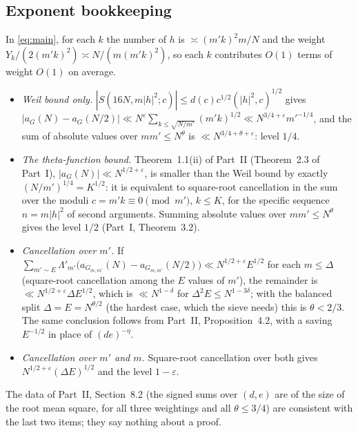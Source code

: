 \documentclass[11pt,a4paper]{article}
\theoremstyle{remark}
\theoremstyle{definition}
\newcommand{\e}{\varepsilon}
\begin{document}
\subsection{Exponent bookkeeping}
In \eqref{eq:main}, for each $k$ the number of $h$ is $\asymp(m'k)^2m/N$ and the weight $Y_k/(2(m'k)^2)\asymp N/(m(m'k)^2)$, so each $k$ contributes $O(1)$ terms of weight $O(1)$ on average.
\begin{itemize}[leftmargin=1.6em]
\item \emph{Weil bound only.} $|S(16N,m|h|^2;c)|\le d(c)c^{1/2}(|h|^2,c)^{1/2}$ gives $|a_G(N)-a_G(N/2)|\ll N^\e\sum_{k\le\sqrt{N/m'}}(m'k)^{1/2}\ll N^{3/4+\e}m'^{-1/4}$, and the sum of absolute values over $mm'\le N^\theta$ is $\ll N^{3/4+\theta+\e}$: level $1/4$.
\item \emph{The theta-function bound.} Theorem~1.1(ii) of Part~II (Theorem~2.3 of Part~I), $|a_G(N)|\ll N^{1/2+\e}$, is smaller than the Weil bound by exactly $(N/m')^{1/4}=K^{1/2}$: it is equivalent to square-root cancellation in the sum over the moduli $c=m'k\equiv0\pmod{m'}$, $k\le K$, for the specific sequence $n=m|h|^2$ of second arguments. Summing absolute values over $mm'\le N^\theta$ gives the level $1/2$ (Part~I, Theorem~3.2).
\item \emph{Cancellation over $m'$.} If $\sum_{m'\sim E}\Lambda'_{m'}\bigl(a_{G_{m,m'}}(N)-a_{G_{m,m'}}(N/2)\bigr)\ll N^{1/2+\e}E^{1/2}$ for each $m\le\Delta$ (square-root cancellation among the $E$ values of $m'$), the remainder is $\ll N^{1/2+\e}\Delta E^{1/2}$, which is $\ll N^{1-\delta}$ for $\Delta^2E\le N^{1-3\delta}$; with the balanced split $\Delta=E=N^{\theta/2}$ (the hardest case, which the sieve needs) this is $\theta<2/3$. The same conclusion follows from Part~II, Proposition~4.2, with a saving $E^{-1/2}$ in place of $(de)^{-\eta}$.
\item \emph{Cancellation over $m'$ and $m$.} Square-root cancellation over both gives $N^{1/2+\e}(\Delta E)^{1/2}$ and the level $1-\e$.
\end{itemize}
The data of Part~II, Section~8.2 (the signed sums over $(d,e)$ are of the size of the root mean square, for all three weightings and all $\theta\le3/4$) are consistent with the last two items; they say nothing about a proof.
\end{document}
